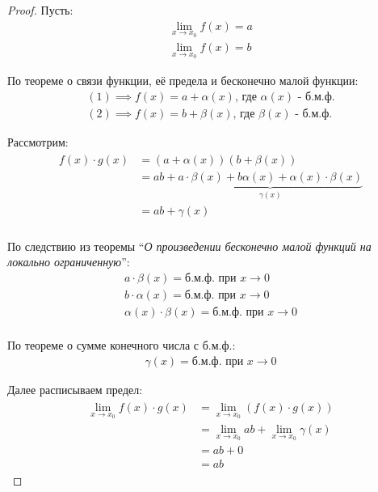 \begin{proof}
    Пусть:
    \begin{gather*}
        \lim_{x \to x_0} f(x) = a \tag{1} \\
        \lim_{x \to x_0} f(x) = b \tag{2}
    \end{gather*}

    По теореме о связи функции, её предела и бесконечно малой функции:
    \begin{gather*}
        (1) \implies f(x) = a + \alpha(x) \text{, где } \alpha(x) \text{ - б.м.ф.} \\
        (2) \implies f(x) = b + \beta(x) \text{, где } \beta(x) \text{ - б.м.ф.}
    \end{gather*}

    Рассмотрим:
    \begin{gather*}
        \begin{align*}
        f(x) \cdot g(x) &= (a + \alpha(x))(b + \beta(x)) \\
                        &= ab + \underbrace{a \cdot \beta(x) + b \alpha (x) + \alpha(x) \cdot \beta(x)}_{\gamma(x)} \\
                        &= ab + \gamma(x) \\
        \end{align*}
    \end{gather*}

    По следствию из теоремы ``\textit{О произведении бесконечно малой функций на локально ограниченную}'':
    \begin{gather*}
        a \cdot \beta(x) = \text{б.м.ф. при } x \to 0 \\ 
        b \cdot \alpha(x) = \text{б.м.ф. при } x \to 0 \\ 
        \alpha(x) \cdot \beta(x) = \text{б.м.ф. при } x \to 0 \\ 
    \end{gather*}

    По теореме о сумме конечного числа с б.м.ф.:
    \begin{gather*}
        \gamma(x) = \text{б.м.ф. при } x \to 0
    \end{gather*}

    Далее расписываем предел:
    \begin{gather*}
        \begin{align*}
            \lim_{x \to x_0} f(x) \cdot g(x) &= \lim_{x \to x_0} (f(x) \cdot g(x)) \\
                &= \lim_{x \to x_0} ab + \lim_{x \to x_0} \gamma(x) \\
                &= ab + 0 \\
                &= ab
        \end{align*}
    \end{gather*}
\end{proof}
\pagebreak




